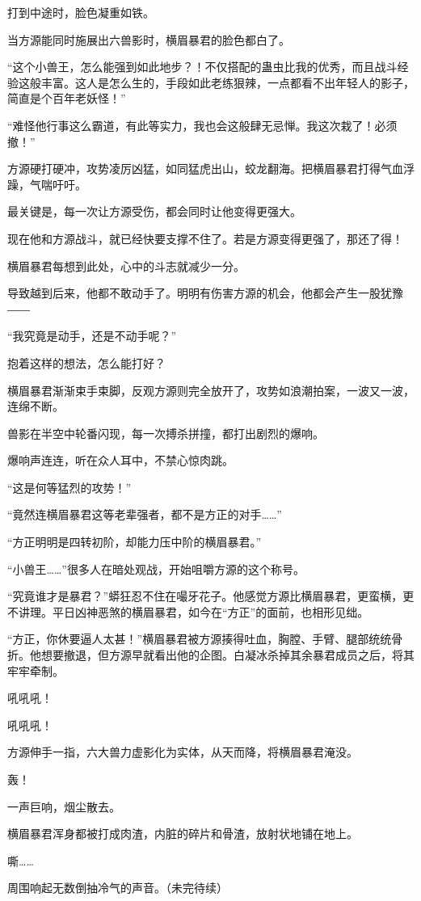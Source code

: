 \begin{this_body}
打到中途时，脸色凝重如铁。

当方源能同时施展出六兽影时，横眉暴君的脸色都白了。

“这个小兽王，怎么能强到如此地步？！不仅搭配的蛊虫比我的优秀，而且战斗经验这般丰富。这人是怎么生的，手段如此老练狠辣，一点都看不出年轻人的影子，简直是个百年老妖怪！”

“难怪他行事这么霸道，有此等实力，我也会这般肆无忌惮。我这次栽了！必须撤！”

方源硬打硬冲，攻势凌厉凶猛，如同猛虎出山，蛟龙翻海。把横眉暴君打得气血浮躁，气喘吁吁。

最关键是，每一次让方源受伤，都会同时让他变得更强大。

现在他和方源战斗，就已经快要支撑不住了。若是方源变得更强了，那还了得！

横眉暴君每想到此处，心中的斗志就减少一分。

导致越到后来，他都不敢动手了。明明有伤害方源的机会，他都会产生一股犹豫――

“我究竟是动手，还是不动手呢？”

抱着这样的想法，怎么能打好？

横眉暴君渐渐束手束脚，反观方源则完全放开了，攻势如浪潮拍案，一波又一波，连绵不断。

兽影在半空中轮番闪现，每一次搏杀拼撞，都打出剧烈的爆响。

爆响声连连，听在众人耳中，不禁心惊肉跳。

“这是何等猛烈的攻势！”

“竟然连横眉暴君这等老辈强者，都不是方正的对手……”

“方正明明是四转初阶，却能力压中阶的横眉暴君。”

“小兽王……”很多人在暗处观战，开始咀嚼方源的这个称号。

“究竟谁才是暴君？”蟒狂忍不住在嘬牙花子。他感觉方源比横眉暴君，更蛮横，更不讲理。平日凶神恶煞的横眉暴君，如今在“方正”的面前，也相形见绌。

“方正，你休要逼人太甚！”横眉暴君被方源揍得吐血，胸膛、手臂、腿部统统骨折。他想要撤退，但方源早就看出他的企图。白凝冰杀掉其余暴君成员之后，将其牢牢牵制。

吼吼吼！

吼吼吼！

方源伸手一指，六大兽力虚影化为实体，从天而降，将横眉暴君淹没。

轰！

一声巨响，烟尘散去。

横眉暴君浑身都被打成肉渣，内脏的碎片和骨渣，放射状地铺在地上。

嘶……

周围响起无数倒抽冷气的声音。（未完待续）

\end{this_body}

